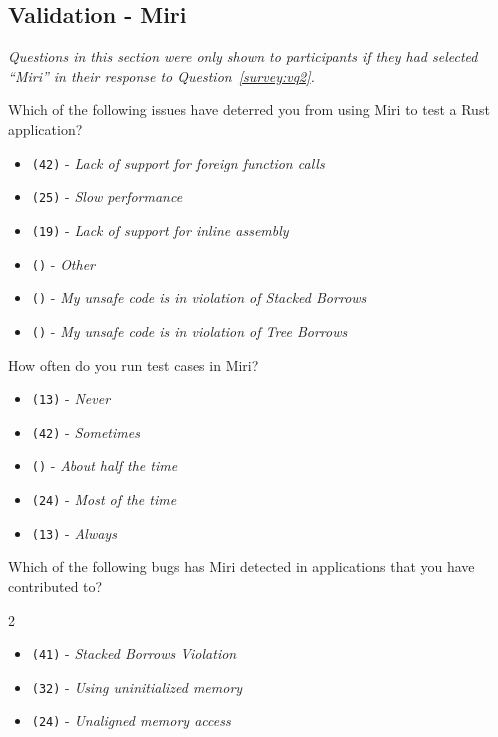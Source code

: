 \subsection{Validation - Miri}
\label{survey:sec:vmq}
\textit{Questions in this section were only shown to participants if they had selected ``\textit{Miri}'' in their response to Question~\ref{survey:vq2}.}

\begin{protocol}
\item \label{survey:vmq1}  Which of the following issues have deterred you from using Miri to test a Rust application?
\begin{itemize}
\item \texttt{(42)} - \textit{Lack of support for foreign function calls}
\item \texttt{(25)} - \textit{Slow performance}
\item \texttt{(19)} - \textit{Lack of support for inline assembly}
\item \texttt{()} - \textit{Other}
\item \texttt{()} - \textit{My unsafe code is in violation of Stacked Borrows}
\item \texttt{()} - \textit{My unsafe code is in violation of Tree Borrows}
\end{itemize}
\item \label{survey:vmq2}  How often do you run test cases in Miri?
\begin{itemize}
\item \texttt{(13)} - \textit{Never}
\item \texttt{(42)} - \textit{Sometimes}
\item \texttt{()} - \textit{About half the time}
\item \texttt{(24)} - \textit{Most of the time}
\item \texttt{(13)} - \textit{Always}
\end{itemize}
\item \label{survey:vmq3}  Which of the following bugs has Miri detected in applications that you have contributed to?
\begin{multicols}{2}
\begin{itemize}
\item \texttt{(41)} - \textit{Stacked Borrows Violation}
\item \texttt{(32)} - \textit{Using uninitialized memory}
\item \texttt{(24)} - \textit{Unaligned memory access}

\end{itemize}
\end{multicols}
\end{protocol}
